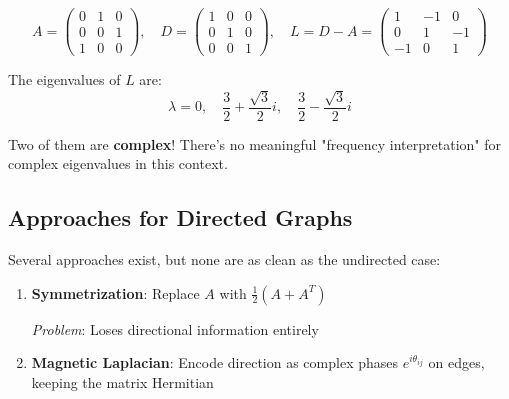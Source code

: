 \begin{notechapter}
\begin{example}
\begin{center}
\end{center}

\[
A = \begin{pmatrix}
0 & 1 & 0 \\
0 & 0 & 1 \\
1 & 0 & 0
\end{pmatrix}, \quad
D = \begin{pmatrix}
1 & 0 & 0 \\
0 & 1 & 0 \\
0 & 0 & 1
\end{pmatrix}, \quad
L = D - A = \begin{pmatrix}
1 & -1 & 0 \\
0 & 1 & -1 \\
-1 & 0 & 1
\end{pmatrix}
\]

The eigenvalues of $L$ are:
\[
\lambda = 0, \quad \frac{3}{2} + \frac{\sqrt{3}}{2}i, \quad 
\frac{3}{2} - \frac{\sqrt{3}}{2}i
\]

Two of them are \textbf{complex}! There's no meaningful "frequency 
interpretation" for complex eigenvalues in this context.
\end{example}

\subsection{Approaches for Directed Graphs}

Several approaches exist, but none are as clean as the undirected case:

\begin{enumerate}
    \item \textbf{Symmetrization}: Replace $A$ with 
          $\frac{1}{2}(A + A^T)$
          
          \textit{Problem}: Loses directional information entirely
          
    \item \textbf{Magnetic Laplacian}: Encode direction as complex 
          phases $e^{i\theta_{ij}}$ on edges, keeping the matrix 
          Hermitian
          

\end{enumerate}
\end{notechapter}
